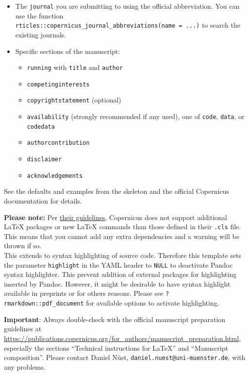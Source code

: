 \documentclass[gc, manuscript, english]{copernicus}
\begin{document}
\begin{itemize}
\item
  The \texttt{journal} you are submitting to using the official
  abbreviation. You can use the function
  \texttt{rticles::copernicus\_journal\_abbreviations(name\ =\ \textquotesingle{}...\textquotesingle{})}
  to search the existing journals.
\item
  Specific sections of the manuscript:

  \begin{itemize}
  \item
    \texttt{running} with \texttt{title} and \texttt{author}
  \item
    \texttt{competinginterests}
  \item
    \texttt{copyrightstatement} (optional)
  \item
    \texttt{availability} (strongly recommended if any used), one of
    \texttt{code}, \texttt{data}, or \texttt{codedata}
  \item
    \texttt{authorcontribution}
  \item
    \texttt{disclaimer}
  \item
    \texttt{acknowledgements}
  \end{itemize}
\end{itemize}

See the defaults and examples from the skeleton and the official
Copernicus documentation for details.

\textbf{Please note:} Per
\href{https://publications.copernicus.org/for_authors/manuscript_preparation.html}{their
guidelines}, Copernicus does not support additional \LaTeX{} packages or
new \LaTeX{} commands than those defined in their \texttt{.cls} file.
This means that you cannot add any extra dependencies and a warning will
be thrown if so.\\
This extends to syntax highlighting of source code. Therefore this
template sets the parameter \texttt{highlight} in the YAML header to
\texttt{NULL} to deactivate Pandoc syntax highlighter. This prevent
addition of external packages for highlighting inserted by Pandoc.
However, it might be desirable to have syntax highlight available in
preprints or for others reasons. Please see
\texttt{?rmarkdown::pdf\_document} for available options to activate
highlighting.

\textbf{Important}: Always double-check with the official manuscript
preparation guidelines at
\url{https://publications.copernicus.org/for_authors/manuscript_preparation.html},
especially the sections ``Technical instructions for LaTeX'' and
``Manuscript composition''. Please contact Daniel Nüst,
\texttt{daniel.nuest@uni-muenster.de}, with any problems.
\end{document}
